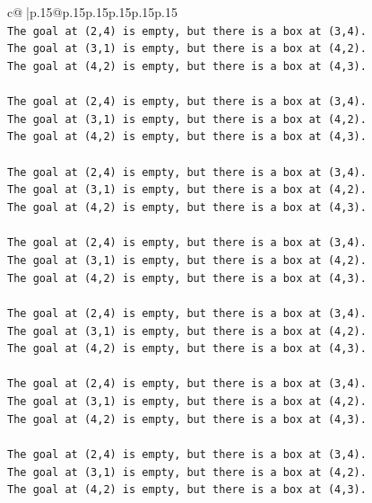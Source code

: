 \documentclass{article}
\begin{document}
{\begin{supertabular}{c@{$\;$}|p{.15\linewidth}@{}p{.15\linewidth}p{.15\linewidth}p{.15\linewidth}p{.15\linewidth}p{.15\linewidth}}
{{{\\ 
\texttt{The goal at (2,4) is empty, but there is a box at (3,4).} \\
\texttt{The goal at (3,1) is empty, but there is a box at (4,2).} \\
\texttt{The goal at (4,2) is empty, but there is a box at (4,3).} \\
\\ 
\texttt{The goal at (2,4) is empty, but there is a box at (3,4).} \\
\texttt{The goal at (3,1) is empty, but there is a box at (4,2).} \\
\texttt{The goal at (4,2) is empty, but there is a box at (4,3).} \\
\\ 
\texttt{The goal at (2,4) is empty, but there is a box at (3,4).} \\
\texttt{The goal at (3,1) is empty, but there is a box at (4,2).} \\
\texttt{The goal at (4,2) is empty, but there is a box at (4,3).} \\
\\ 
\texttt{The goal at (2,4) is empty, but there is a box at (3,4).} \\
\texttt{The goal at (3,1) is empty, but there is a box at (4,2).} \\
\texttt{The goal at (4,2) is empty, but there is a box at (4,3).} \\
\\ 
\texttt{The goal at (2,4) is empty, but there is a box at (3,4).} \\
\texttt{The goal at (3,1) is empty, but there is a box at (4,2).} \\
\texttt{The goal at (4,2) is empty, but there is a box at (4,3).} \\
\\ 
\texttt{The goal at (2,4) is empty, but there is a box at (3,4).} \\
\texttt{The goal at (3,1) is empty, but there is a box at (4,2).} \\
\texttt{The goal at (4,2) is empty, but there is a box at (4,3).} \\
\\ 
\texttt{The goal at (2,4) is empty, but there is a box at (3,4).} \\
\texttt{The goal at (3,1) is empty, but there is a box at (4,2).} \\
\texttt{The goal at (4,2) is empty, but there is a box at (4,3).} \\
\\ 
}}}
\end{supertabular}}
\end{document}
